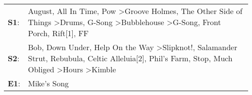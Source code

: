 \begin{supertabular}{p{0.03\textwidth}p{0.92\textwidth}}
 \textbf{S1}:  &  August\textsuperscript{}, \enspace All In Time\textsuperscript{}, \enspace Pow\textsuperscript{} \textgreater \enspace Groove Holmes\textsuperscript{}, \enspace The Other Side of Things\textsuperscript{} \textgreater \enspace Drums\textsuperscript{}, \enspace G-Song\textsuperscript{} \textgreater \enspace Bubblehouse\textsuperscript{} \textgreater \enspace G-Song\textsuperscript{}, \enspace Front Porch\textsuperscript{}, \enspace Rift[1]\textsuperscript{}, \enspace FF\textsuperscript{}  \enspace  \\
 \textbf{S2}:  &  Bob\textsuperscript{}, \enspace Down Under\textsuperscript{}, \enspace Help On the Way\textsuperscript{} \textgreater \enspace Slipknot!\textsuperscript{}, \enspace Salamander Strut\textsuperscript{}, \enspace Rebubula\textsuperscript{}, \enspace Celtic Alleluia[2]\textsuperscript{}, \enspace Phil's Farm\textsuperscript{}, \enspace Stop\textsuperscript{}, \enspace Much Obliged\textsuperscript{} \textgreater \enspace Hours\textsuperscript{} \textgreater \enspace Kimble\textsuperscript{}  \enspace  \\
 \textbf{E1}:  &                                                                                                                                                                                                                                                                                                                                                                                                                                                                               Mike's Song\textsuperscript{}  \enspace  \\
\end{supertabular}
